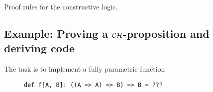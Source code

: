 \begin{table}
\begin{centering}
{\small{}}%
\par\end{centering}
\caption{Proof rules for the constructive logic.\label{tab:Proof-rules-for-constructive-logic}}
\end{table}


\subsection{Example: Proving a ${\cal CH}$-proposition and deriving code\label{subsec:Example:-Proving-a-ch-proposition}}

The task is to implement a fully parametric function

\begin{wrapfigure}{l}{0.52\columnwidth}%
\vspace{-0.75\baselineskip}
\begin{lstlisting}
def f[A, B]: ((A => A) => B) => B = ???
\end{lstlisting}

\vspace{-0.9\baselineskip}
\end{wrapfigure}%

